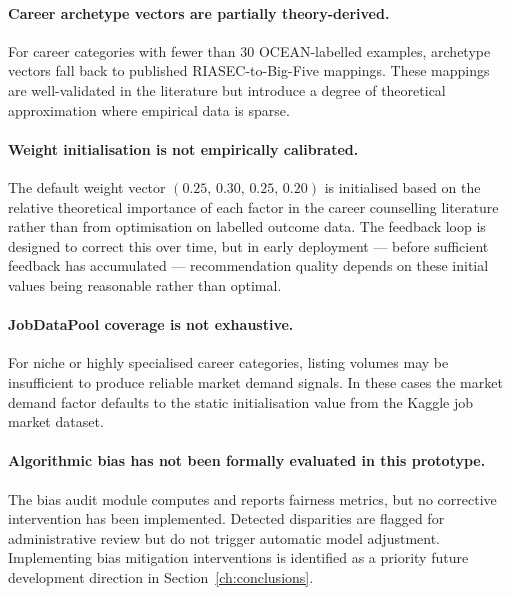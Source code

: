 \paragraph{Career archetype vectors are partially theory-derived.}
For career categories with fewer than 30 OCEAN-labelled examples, archetype
vectors fall back to published RIASEC-to-Big-Five mappings. These mappings are
well-validated in the literature but introduce a degree of theoretical
approximation where empirical data is sparse.

\paragraph{Weight initialisation is not empirically calibrated.}
The default weight vector $(0.25,\,0.30,\,0.25,\,0.20)$ is initialised based
on the relative theoretical importance of each factor in the career counselling
literature rather than from optimisation on labelled outcome data. The feedback
loop is designed to correct this over time, but in early deployment --- before
sufficient feedback has accumulated --- recommendation quality depends on these
initial values being reasonable rather than optimal.

\paragraph{JobDataPool coverage is not exhaustive.}
For niche or highly specialised career categories, listing volumes may be
insufficient to produce reliable market demand signals. In these cases the
market demand factor defaults to the static initialisation value from the
Kaggle job market dataset.

\paragraph{Algorithmic bias has not been formally evaluated in this prototype.}
The bias audit module computes and reports fairness metrics, but no corrective
intervention has been implemented. Detected disparities are flagged for
administrative review but do not trigger automatic model adjustment.
Implementing bias mitigation interventions is identified as a priority future
development direction in Section~\ref{ch:conclusions}.
